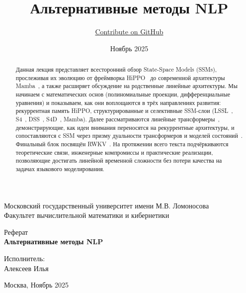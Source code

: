 \documentclass[11pt]{extarticle}
\title{Альтернативные методы NLP}
\author{\href{https://github.com/voorhs/nlp-alternative-methods}{Contribute on GitHub}}
\date{Ноябрь 2025}
\begin{document}
\begin{titlepage}
    \begin{center}
        {\large Московский государственный университет имени М.В. Ломоносова}\\[0.2em]
        {\large Факультет вычислительной математики и кибернетики}

        \vspace{6cm}

        {\Large Реферат}\\[1em]
        {\Large \textbf{Альтернативные методы NLP}}
    \end{center}

    \vspace{4cm}

    \begin{flushright}
        Исполнитель:\\
        Алексеев Илья
    \end{flushright}

    \vfill

    \begin{center}
        Москва, Ноябрь 2025
    \end{center}
\end{titlepage}

\tableofcontents
\newpage

\begin{abstract}
Данная лекция представляет всесторонний обзор State-Space Models (SSMs), прослеживая их эволюцию от фреймворка HiPPO~\cite{gu2020hipporecurrentmemoryoptimal} до современной архитектуры Mamba~\cite{gu2024mambalineartimesequencemodeling}, а также расширяет обсуждение на родственные линейные архитектуры. Мы начинаем с математических основ (полиномиальные проекции, дифференциальные уравнения) и показываем, как они воплощаются в трёх направлениях развития: рекуррентная память HiPPO, структурированные и селективные SSM-слои (LSSL~\cite{gu2021combiningrecurrentconvolutionalcontinuoustime}, S4~\cite{gu2022efficientlymodelinglongsequences}, DSS~\cite{gupta2022diagonalstatespaceseffective}, S4D~\cite{gu2022parameterizationinitializationdiagonalstate}, Mamba). Далее рассматриваются линейные трансформеры~\cite{katharopoulos2020transformersrnnsfastautoregressive,yang2025parallelizinglineartransformersdelta,kimiteam2025kimilinearexpressiveefficient}, демонстрирующие, как идеи внимания переносятся на рекуррентные архитектуры, и сопоставляются с SSM через призму дуальности трансформеров и моделей состояний~\cite{dao2024transformersssmsgeneralizedmodels}. Финальный блок посвящён RWKV~\cite{peng2023rwkvreinventingrnnstransformer,rwkv}. На протяжении всего текста подчёркиваются теоретические связи, инженерные компромиссы и практические реализации, позволяющие достигать линейной временной сложности без потери качества на задачах языкового моделирования.
\end{abstract}
\end{document}
